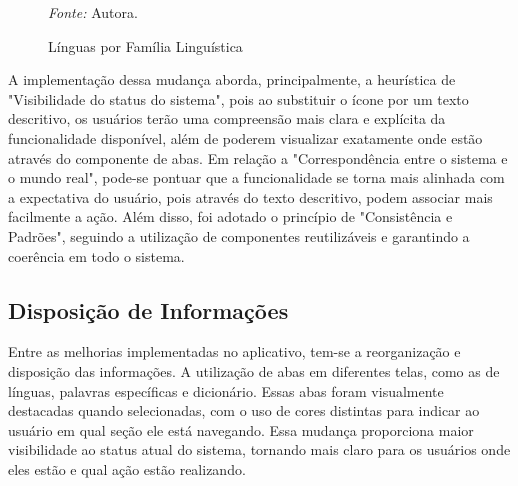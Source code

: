 \begin{figure}[h!]
	\centering
	\caption{Línguas por Família Linguística}
	\begin{tablenotes}[flushleft]
		\centering
		\item \textit{Fonte:} Autora.
	\end{tablenotes}
	\label{fig23}
\end{figure}

A implementação dessa mudança aborda, principalmente, a heurística de "Visibilidade do status do sistema", pois ao substituir o ícone por um texto descritivo, os usuários terão uma compreensão mais clara e explícita da 
funcionalidade disponível, além de poderem visualizar exatamente onde estão através do componente de abas. Em relação a "Correspondência entre o sistema e o mundo real", pode-se pontuar que a funcionalidade se torna mais 
alinhada com a expectativa do usuário, pois através do texto descritivo, podem associar mais facilmente a ação. Além disso, foi adotado o princípio de "Consistência e Padrões", seguindo a utilização de componentes 
reutilizáveis e garantindo a coerência em todo o sistema. 

\subsection{Disposição de Informações}
\label{sec:Disposicao de Informacoes}

Entre as melhorias implementadas no aplicativo, tem-se a reorganização e disposição das informações. A utilização de abas em diferentes telas, como as de línguas, palavras específicas e dicionário. Essas abas foram 
visualmente destacadas quando selecionadas, com o uso de cores distintas para indicar ao usuário em qual seção ele está navegando. Essa mudança proporciona maior visibilidade ao status atual do sistema, tornando mais 
claro para os usuários onde eles estão e qual ação estão realizando.

